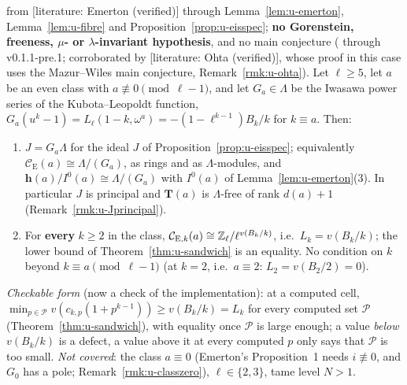 \documentclass[11pt]{article}
\newcommand{\LIT}[1]{\textsf{[literature: #1]}}   %
\newcommand{\Iw}{\Lambda}                         %
\newcommand{\hcusp}{\mathbf{h}}                   %
\newcommand{\Tu}{\mathbf{T}}                      %
\newcommand{\Eis}{\mathrm{E}}
\newcommand{\Cg}{\mathcal{C}}                     %
\newcommand{\Zl}{\Z_\ell}
\begin{document}
\begin{prediction}\label{pr:u-U1}
\PROVED{} from \LIT{Emerton \cite[Thm.~5, p.~6]{emerton_eis} (verified)} through Lemma~\ref{lem:u-emerton}, Lemma~\ref{lem:u-fibre} and
Proposition~\ref{prop:u-eisspec}; \textbf{no Gorenstein, freeness, $\mu$- or $\lambda$-invariant hypothesis}, and no main conjecture
(\CONJ{} through v0.1.1-pre.1; corroborated by \LIT{Ohta \cite[Thm.~(1.5.5)(II), p.~238]{ohta_cong} (verified)}, whose proof in this case uses the
Mazur--Wiles main conjecture, Remark~\ref{rmk:u-ohta}). Let $\ell\ge5$, let $a$ be an even class with $a\not\equiv0\pmod{\ell-1}$, and let $G_a\in\Iw$ be the
Iwasawa power series of the Kubota--Leopoldt function, $G_a(u^{k}-1)=L_\ell(1-k,\omega^{a})=-(1-\ell^{k-1})B_k/k$ for $k\equiv a$. Then:
\begin{enumerate}
\item[(U1-$\Iw$)] $J=G_a\Iw$ for the ideal $J$ of Proposition~\ref{prop:u-eisspec}; equivalently $\Cg_\Eis(a)\cong\Iw/(G_a)$, as rings and as $\Iw$-modules, and
  $\hcusp(a)/I^{0}(a)\cong\Iw/(G_a)$ with $I^{0}(a)$ of Lemma~\ref{lem:u-emerton}(3). In particular $J$ is principal and $\Tu(a)$ is $\Iw$-free of rank $d(a)+1$
  (Remark~\ref{rmk:u-Jprincipal}).
\item[(U1-$k$)] For \textbf{every} $k\ge2$ in the class, $\Cg_{\Eis,k}(a)\cong\Zl/\ell^{v(B_k/k)}$, i.e.\ $L_k=v(B_k/k)$; the lower bound of
  Theorem~\ref{thm:u-sandwich} is an equality. No condition on $k$ beyond $k\equiv a\pmod{\ell-1}$ (at $k=2$, i.e.\ $a\equiv2$: $L_2=v(B_2/2)=0$).
\end{enumerate}
\emph{Checkable form} (now a check of the implementation): at a computed cell, $\min_{p\in\mathcal P}v(c_{k,p}(1+p^{k-1}))\ge v(B_k/k)=L_k$ for every computed set
$\mathcal P$ (Theorem~\ref{thm:u-sandwich}), with equality once $\mathcal P$ is large enough; a value \emph{below} $v(B_k/k)$ is a defect, a value above it at every
computed $p$ only says that $\mathcal P$ is too small. \emph{Not covered}: the class $a\equiv0$ (Emerton's Proposition~1 needs $i\not\equiv0$, and $G_0$ has a
pole; Remark~\ref{rmk:u-classzero}), $\ell\in\{2,3\}$, tame level $N>1$.
\end{prediction}
\end{document}
